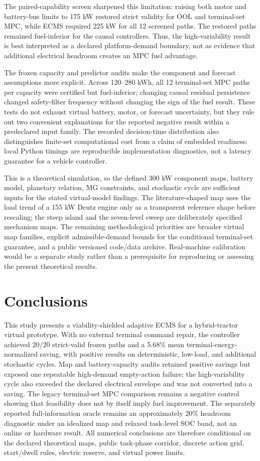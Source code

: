\documentclass[energies,article,submit,moreauthors]{Definitions/mdpi}
\begin{document}
The paired-capability screen sharpened this limitation: raising both motor and battery-bus limits to 175 kW restored strict validity for OOL and terminal-set MPC, while ECMS required 225 kW for all 12 screened paths. The restored paths remained fuel-inferior for the causal controllers. Thus, the high-variability result is best interpreted as a declared platform-demand boundary, not as evidence that additional electrical headroom creates an MPC fuel advantage.

The frozen capacity and predictor audits make the component and forecast assumptions more explicit. Across 120--280 kWh, all 12 terminal-set MPC paths per capacity were certified but fuel-inferior; changing causal residual persistence changed safety-filter frequency without changing the sign of the fuel result. These tests do not exhaust virtual battery, motor, or forecast uncertainty, but they rule out two convenient explanations for the reported negative result within a predeclared input family. The recorded decision-time distribution also distinguishes finite-set computational cost from a claim of embedded readiness: local Python timings are reproducible implementation diagnostics, not a latency guarantee for a vehicle controller.

This is a theoretical simulation, so the defined 300 kW component maps, battery model, planetary relation, MG constraints, and stochastic cycle are sufficient inputs for the stated virtual-model findings. The literature-shaped map uses the load trend of a 155 kW Deutz engine only as a transparent reference shape before rescaling; the steep island and the seven-level sweep are deliberately specified mechanism maps. The remaining methodological priorities are broader virtual map families, explicit admissible-demand bounds for the conditional terminal-set guarantee, and a public versioned code/data archive. Real-machine calibration would be a separate study rather than a prerequisite for reproducing or assessing the present theoretical results.

\section{Conclusions}
This study presents a viability-shielded adaptive ECMS for a hybrid-tractor virtual prototype. With no external terminal command repair, the controller achieved 20/20 strict-valid frozen paths and a 5.68\% mean terminal-energy-normalized saving, with positive results on deterministic, low-load, and additional stochastic cycles. Map and battery-capacity audits retained positive savings but exposed one repeatable high-demand empty-action failure; the high-variability cycle also exceeded the declared electrical envelope and was not converted into a saving. The legacy terminal-set MPC comparison remains a negative control showing that feasibility does not by itself imply fuel improvement. The separately reported full-information oracle remains an approximately 20\% headroom diagnostic under an idealized map and relaxed task-level SOC band, not an online or hardware result. All numerical conclusions are therefore conditional on the declared theoretical maps, public task-phase corridor, discrete action grid, start/dwell rules, electric reserve, and virtual power limits.
\end{document}
